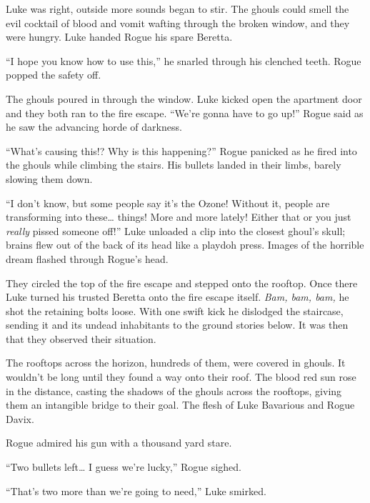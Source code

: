 Luke was right, outside more sounds began to stir. The ghouls could
smell the evil cocktail of blood and vomit wafting through the broken
window, and they were hungry. Luke handed Rogue his spare Beretta.



``I hope you know how to use this,'' he snarled
through his clenched teeth. Rogue popped the safety off.



The ghouls poured in through the window. Luke kicked open the
apartment door and they both ran to the fire escape.
``We're gonna have to go up!'' Rogue said as he saw
the advancing horde of darkness.



``What's causing this!? Why is this happening?''
Rogue panicked as he fired into the ghouls while climbing the
stairs. His bullets landed in their limbs, barely slowing them
down.



``I don't know, but some people say it's the
Ozone! Without it, people are transforming into these{\ldots}
things! More and more lately! Either that or you just {\em really}
pissed someone off!'' Luke unloaded a clip into the closest
ghoul's skull; brains flew out of the back of its head like a
playdoh press. Images of the horrible dream flashed through
Rogue's head.



They circled the top of the fire escape and stepped onto the
rooftop. Once there Luke turned his trusted Beretta onto the fire
escape itself. {\em Bam, bam, bam,} he shot the retaining bolts
loose. With one swift kick he dislodged the staircase, sending it
and its undead inhabitants to the ground stories below. It was then
that they observed their situation.



The rooftops across the horizon, hundreds of them, were covered in
ghouls. It wouldn't be long until they found a way onto their
roof. The blood red sun rose in the distance, casting the shadows
of the ghouls across the rooftops, giving them an intangible bridge
to their goal. The flesh of Luke Bavarious and Rogue Davix.

Rogue admired his gun with a thousand yard stare.



``Two bullets left{\ldots} I guess we're lucky,'' Rogue
sighed.

``That's two more than we're going to need,''
Luke smirked.

